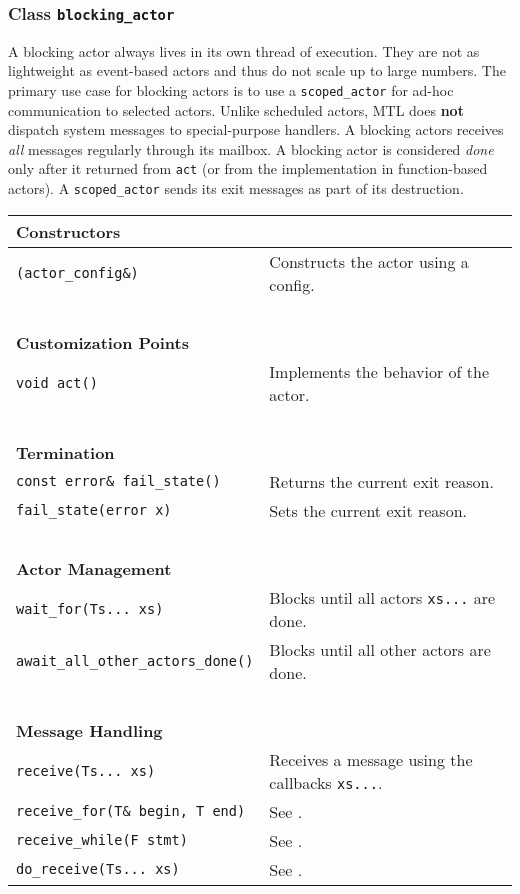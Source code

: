 \clearpage
\subsubsection{Class \lstinline^blocking_actor^}

A blocking actor always lives in its own thread of execution. They are not as
lightweight as event-based actors and thus do not scale up to large numbers.
The primary use case for blocking actors is to use a \lstinline^scoped_actor^
for ad-hoc communication to selected actors. Unlike scheduled actors, MTL does
\textbf{not} dispatch system messages to special-purpose handlers. A blocking
actors receives \emph{all} messages regularly through its mailbox. A blocking
actor is considered \emph{done} only after it returned from \lstinline^act^ (or
from the implementation in function-based actors). A \lstinline^scoped_actor^
sends its exit messages as part of its destruction.

\begin{center}
\begin{tabular}{ll}
  \textbf{Constructors} & ~ \\
  \hline
  \lstinline^(actor_config&)^ & Constructs the actor using a config. \\
  \hline
  ~ & ~ \\ \textbf{Customization Points} & ~ \\
  \hline
  \lstinline^void act()^ & Implements the behavior of the actor. \\
  \hline
  ~ & ~ \\ \textbf{Termination} & ~ \\
  \hline
  \lstinline^const error& fail_state()^ & Returns the current exit reason. \\
  \hline
  \lstinline^fail_state(error x)^ & Sets the current exit reason. \\
  \hline
  ~ & ~ \\ \textbf{Actor Management} & ~ \\
  \hline
  \lstinline^wait_for(Ts... xs)^ & Blocks until all actors \lstinline^xs...^ are done. \\
  \hline
  \lstinline^await_all_other_actors_done()^ & Blocks until all other actors are done. \\
  \hline
  ~ & ~ \\ \textbf{Message Handling} & ~ \\
  \hline
  \lstinline^receive(Ts... xs)^ & Receives a message using the callbacks \lstinline^xs...^. \\
  \hline
  \lstinline^receive_for(T& begin, T end)^ & See . \\
  \hline
  \lstinline^receive_while(F stmt)^ & See . \\
  \hline
  \lstinline^do_receive(Ts... xs)^ & See . \\
  \hline
\end{tabular}
\end{center}


